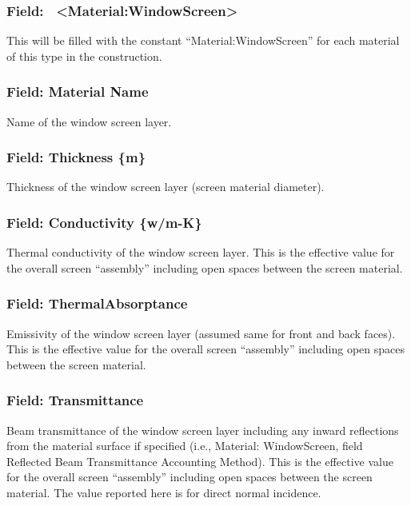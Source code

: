 \subsubsection{Field:~ \textless{}Material:WindowScreen\textgreater{}}\label{field-materialwindowscreen}

This will be filled with the constant ``Material:WindowScreen'' for each material of this type in the construction.

\subsubsection{Field: Material Name}\label{field-material-name-6}

Name of the window screen layer.

\subsubsection{Field: Thickness \{m\}}\label{field-thickness-m-3}

Thickness of the window screen layer (screen material diameter).

\subsubsection{Field: Conductivity \{w/m-K\}}\label{field-conductivity-wm-k-2}

Thermal conductivity of the window screen layer. This is the effective value for the overall screen ``assembly'' including open spaces between the screen material.

\subsubsection{Field: ThermalAbsorptance}\label{field-thermalabsorptance-1}

Emissivity of the window screen layer (assumed same for front and back faces). This is the effective value for the overall screen ``assembly'' including open spaces between the screen material.

\subsubsection{Field: Transmittance}\label{field-transmittance}

Beam transmittance of the window screen layer including any inward reflections from the material surface if specified (i.e., Material: WindowScreen, field Reflected Beam Transmittance Accounting Method). This is the effective value for the overall screen ``assembly'' including open spaces between the screen material. The value reported here is for direct normal incidence.

